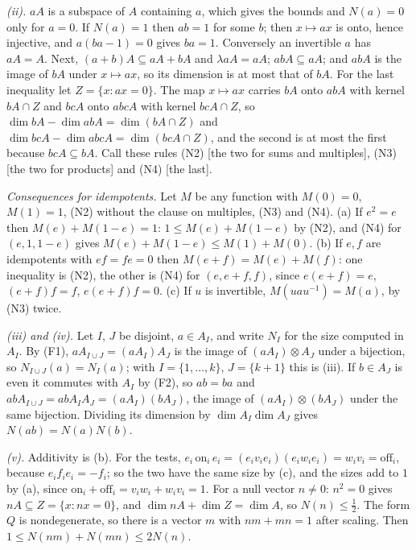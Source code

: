 \emph{(ii).} $aA$ is a subspace of $A$ containing $a$, which gives the bounds and $N(a) = 0$ only for $a = 0$. If $N(a) = 1$ then $ab = 1$ for some $b$; then $x \mapsto ax$ is onto, hence injective, and $a(ba - 1) = 0$ gives $ba = 1$. Conversely an invertible $a$ has $aA = A$. Next, $(a + b)A \subseteq aA + bA$ and $\lambda aA = aA$; $abA \subseteq aA$; and $abA$ is the image of $bA$ under $x \mapsto ax$, so its dimension is at most that of $bA$. For the last inequality let $Z = \{x : ax = 0\}$. The map $x \mapsto ax$ carries $bA$ onto $abA$ with kernel $bA \cap Z$ and $bcA$ onto $abcA$ with kernel $bcA \cap Z$, so $\dim bA - \dim abA = \dim(bA \cap Z)$ and $\dim bcA - \dim abcA = \dim(bcA \cap Z)$, and the second is at most the first because $bcA \subseteq bA$. Call these rules (N2) [the two for sums and multiples], (N3) [the two for products] and (N4) [the last].

\emph{Consequences for idempotents.} Let $M$ be any function with $M(0) = 0$, $M(1) = 1$, (N2) without the clause on multiples, (N3) and (N4). (a) If $e^{2} = e$ then $M(e) + M(1 - e) = 1$: $1 \le M(e) + M(1 - e)$ by (N2), and (N4) for $(e, 1, 1 - e)$ gives $M(e) + M(1 - e) \le M(1) + M(0)$. (b) If $e, f$ are idempotents with $ef = fe = 0$ then $M(e + f) = M(e) + M(f)$: one inequality is (N2), the other is (N4) for $(e, e + f, f)$, since $e(e + f) = e$, $(e + f)f = f$, $e(e + f)f = 0$. (c) If $u$ is invertible, $M(uau^{-1}) = M(a)$, by (N3) twice.

\emph{(iii) and (iv).} Let $I$, $J$ be disjoint, $a \in A_{I}$, and write $N_{I}$ for the size computed in $A_{I}$. By (F1), $aA_{I \cup J} = (aA_{I})A_{J}$ is the image of $(aA_{I}) \otimes A_{J}$ under a bijection, so $N_{I \cup J}(a) = N_{I}(a)$; with $I = \{1, \dots, k\}$, $J = \{k + 1\}$ this is (iii). If $b \in A_{J}$ is even it commutes with $A_{I}$ by (F2), so $ab = ba$ and $abA_{I \cup J} = abA_{I}A_{J} = (aA_{I})(bA_{J})$, the image of $(aA_{I}) \otimes (bA_{J})$ under the same bijection. Dividing its dimension by $\dim A_{I}\dim A_{J}$ gives $N(ab) = N(a)N(b)$.

\emph{(v).} Additivity is (b). For the tests, $e_{i}\,\mathrm{on}_{i}\,e_{i} = (e_{i}v_{i}e_{i})(e_{i}w_{i}e_{i}) = w_{i}v_{i} = \mathrm{off}_{i}$, because $e_{i}f_{i}e_{i} = -f_{i}$; so the two have the same size by (c), and the sizes add to $1$ by (a), since $\mathrm{on}_{i} + \mathrm{off}_{i} = v_{i}w_{i} + w_{i}v_{i} = 1$. For a null vector $n \ne 0$: $n^{2} = 0$ gives $nA \subseteq Z = \{x : nx = 0\}$, and $\dim nA + \dim Z = \dim A$, so $N(n) \le \tfrac12$. The form $Q$ is nondegenerate, so there is a vector $m$ with $nm + mn = 1$ after scaling. Then $1 \le N(nm) + N(mn) \le 2N(n)$.

